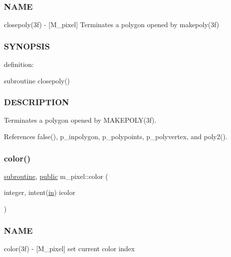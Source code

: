 \subsubsection*{N\+A\+ME}

closepoly(3f) -\/ \mbox{[}M\+\_\+pixel\mbox{]} Terminates a polygon opened by makepoly(3f) 

\subsubsection*{S\+Y\+N\+O\+P\+S\+IS}

definition\+: \begin{DoxyVerb} subroutine closepoly()
\end{DoxyVerb}


\subsubsection*{D\+E\+S\+C\+R\+I\+P\+T\+I\+ON}

Terminates a polygon opened by M\+A\+K\+E\+P\+O\+L\+Y(3f). 

References false(), p\+\_\+inpolygon, p\+\_\+polypoints, p\+\_\+polyvertex, and poly2().

\mbox{\label{namespacem__pixel_a334bde41bc7b2db19b950b1271ba7463}} 
\subsubsection{\texorpdfstring{color()}{color()}}
{\footnotesize\ttfamily \hyperlink{M__stopwatch_83_8txt_acfbcff50169d691ff02d4a123ed70482}{subroutine}, \hyperlink{M__stopwatch_83_8txt_a2f74811300c361e53b430611a7d1769f}{public} m\+\_\+pixel\+::color (\begin{DoxyParamCaption}\item[{integer, intent(\hyperlink{M__journal_83_8txt_afce72651d1eed785a2132bee863b2f38}{in})}]{icolor }\end{DoxyParamCaption})}



\subsubsection*{N\+A\+ME}

color(3f) -\/ \mbox{[}M\+\_\+pixel\mbox{]} set current color index 

